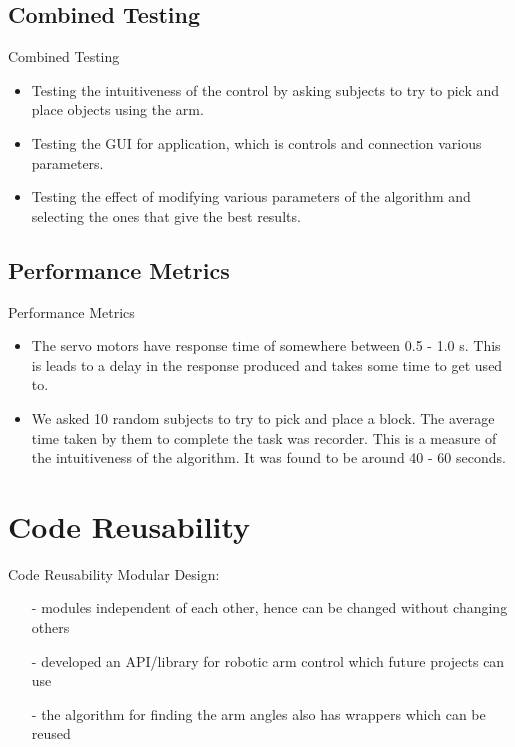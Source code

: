 \documentclass{beamer}
\begin{document}
\subsection{Combined Testing}
\begin{frame}{Combined Testing}
\begin{itemize} 
\item Testing the intuitiveness of the control by asking subjects to try to pick and place objects using the arm.
\item Testing the GUI for application, which is controls and connection various parameters.
\item Testing the effect of modifying various parameters of the algorithm and selecting the ones that give the best results.
\end{itemize}
\end{frame}

\subsection{Performance Metrics}
\begin{frame}{Performance Metrics}
\begin{itemize}
\item The servo motors have response time of somewhere between 0.5 - 1.0 s. This is leads to a delay in the response produced and takes some time to get used to.
\item We asked 10 random subjects to try to pick and place a block. The average time taken by them to complete the task was recorder. This is a measure of the intuitiveness of the algorithm. It was found to be around 40 - 60 seconds.  
\end{itemize}
\end{frame}

\section{Code Reusability}
\begin{frame}{Code Reusability}
Modular Design:
\begin{itemize}
\item[-] modules independent of each other, hence can be changed without changing others
\item[-] developed an API/library for robotic arm control which future projects can use
\item[-] the algorithm for finding the arm angles also has wrappers which can  be reused
\end{itemize}
\end{frame}
\end{document}
